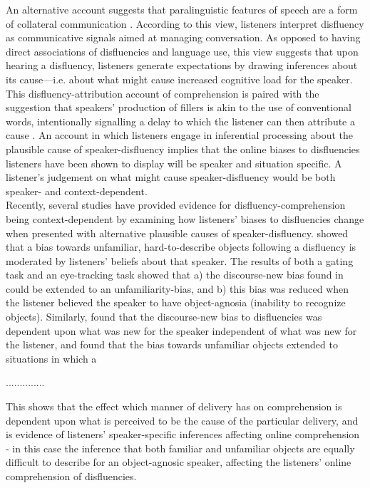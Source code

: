 \documentclass[man]{apa6}
\begin{document}
An alternative account suggests that paralinguistic features of speech are a form of collateral communication \citep{Clark1996}. 
According to this view, listeners interpret disfluency as communicative signals aimed at managing conversation. 
As opposed to having direct associations of disfluencies and language use, this view suggests that upon hearing a disfluency, listeners generate expectations by drawing inferences about its cause---i.e. about what might cause increased cognitive load for the speaker. 
This disfluency-attribution account of comprehension is paired with the suggestion that speakers' production of fillers is akin to the use of conventional words, intentionally signalling a delay to which the listener can then attribute a cause \citep{Clark2002}. 
An account in which listeners engage in inferential processing about the plausible cause of speaker-disfluency implies that the online biases to disfluencies listeners have been shown to display will be speaker and situation specific. 
A listener's judgement on what might cause speaker-disfluency would be both speaker- and context-dependent.\\

Recently, several studies have provided evidence for disfluency-comprehension being context-dependent by examining how listeners' biases to disfluencies change when presented with alternative plausible causes of speaker-disfluency. 
\citet{Arnold2007} showed that a bias towards unfamiliar, hard-to-describe objects following a disfluency is moderated by listeners' beliefs about that speaker. 
The results of both a gating task and an eye-tracking task showed that a) the discourse-new bias found in \citet{Arnold2004} could be extended to an unfamiliarity-bias, and b) this bias was reduced when the listener believed the speaker to have object-agnosia (inability to recognize objects). 
Similarly, \citet{Barr2010} found that the discourse-new bias to disfluencies was dependent upon what was new for the speaker independent of what was new for the listener, and \citet{Heller2015} found that the bias towards unfamiliar objects extended to situations in which a


..............


This shows that the effect which manner of delivery has on comprehension is dependent upon what is perceived to be the cause of the particular delivery, and is evidence of listeners' speaker-specific inferences affecting online comprehension - in this case the inference that both familiar and unfamiliar objects are equally difficult to describe for an object-agnosic speaker, affecting the listeners' online comprehension of disfluencies.\\
\end{document}
